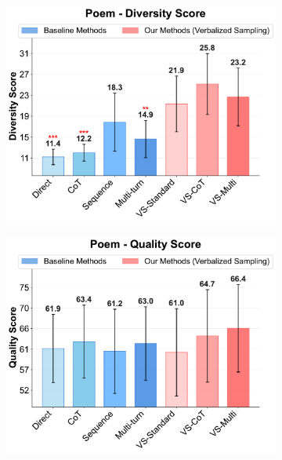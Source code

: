 \begin{figure}[!htbp]
  \centering
  \begin{subfigure}[t]{0.48\textwidth}
      \centering
      \includegraphics[width=\textwidth]{figures/creative_writing/poem/poem_diversity_appendix.pdf}
      \label{fig:poem_creative_diversity}
  \end{subfigure}
  \hfill
  \begin{subfigure}[t]{0.48\textwidth}
      \centering
      \includegraphics[width=\textwidth]{figures/creative_writing/poem/poem_quality_appendix.pdf}

\end{subfigure}
\end{figure}
